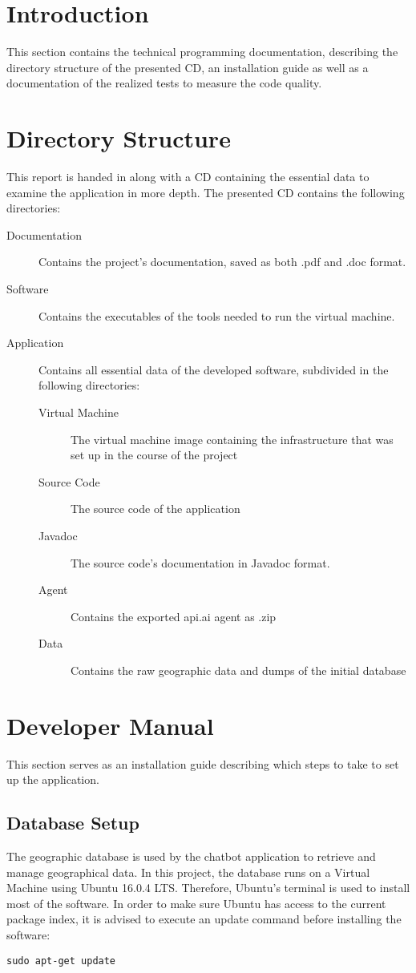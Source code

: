 
\section{Introduction}
This section contains the technical programming documentation, describing the directory structure of the presented CD, an installation guide as well as a documentation of the realized tests to measure the code quality.

\section{Directory Structure}
This report is handed in along with a CD containing the essential data to examine the application in more depth. The presented CD contains the following directories:
\begin{description}
\item[Documentation] 
Contains the project’s documentation, saved as both .pdf and .doc format.
\item[Software] 
Contains the executables of the tools needed to run the virtual machine. 
\item[Application] 
Contains all essential data of the developed software, subdivided in the following directories:
\begin{description}
\item[Virtual Machine] The virtual machine image containing the infrastructure that was set up in the course of the project
\item[Source Code] The source code of the application
\item[Javadoc] The source code’s documentation in Javadoc format.
\item[Agent] Contains the exported api.ai agent as .zip
\item[Data] Contains the raw geographic data and dumps of the initial database 
\end{description}
\end{description}

\section{Developer Manual}
This section serves as an installation guide describing which steps to take to set up the application. 

\subsection{Database Setup} \label{ssec:dbs}
The geographic database is used by the chatbot application to retrieve and manage geographical data. In this project, the database runs on a Virtual Machine using Ubuntu 16.0.4 LTS. Therefore, Ubuntu’s terminal is used to install most of the software. In order to make sure Ubuntu has access to the current package index, it is advised to execute an update command before installing the software:
\begin{lstlisting}
sudo apt-get update
\end{lstlisting}
